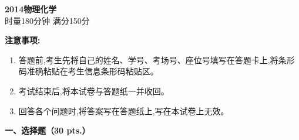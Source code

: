 \begin{center}
    {\LARGE \textbf{2014物理化学}} \\[2ex]
    {\large 时量180分钟 \quad 满分150分}
\end{center}

\vspace{0.5cm}
\noindent\textbf{注意事项:}
\begin{enumerate}[label=\arabic*., parsep=0pt, itemsep=0pt]
    \item 答题前,考生先将自己的姓名、学号、考场号、座位号填写在答题卡上,将条形码准确粘贴在考生信息条形码粘贴区。
    \item 考试结束后,将本试卷与答题纸一并收回。
    \item 回答各个问题时,将答案写在答题纸上,写在本试卷上无效。
\end{enumerate}

\vspace{0.5cm}
\noindent\textbf{一、选择题（30 pts.）}

